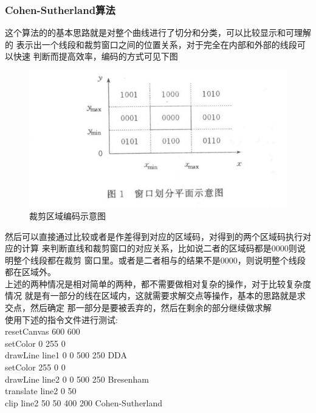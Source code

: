 \documentclass[a4paper,UTF8]{article}
\theoremstyle{definition}
\begin{document}
\subsubsection{Cohen-Sutherland算法}
这个算法的的基本思路就是对整个曲线进行了切分和分类，可以比较显示和可理解的
表示出一个线段和裁剪窗口之间的位置关系，对于完全在内部和外部的线段可以快速
判断而提高效率，编码的方式可见下图
\begin{figure}[h]
	\centering
	\includegraphics[scale=0.4]{figure/2.png}
	\caption{裁剪区域编码示意图}
	\label{fig:Rotate}
\end{figure}
然后可以直接通过比较或者是作差得到对应的区域码，对得到的两个区域码执行对应的计算
来判断直线和裁剪窗口的对应关系，比如说二者的区域码都是0000则说明整个线段都在裁剪
窗口里。或者是二者相与的结果不是0000，则说明整个线段都在区域外。\\
上述的两种情况是相对简单的两种，都不需要做相对复杂的操作，对于比较复杂度情况
就是有一部分的线在区域内，这就需要求解交点等操作，基本的思路就是求交点，然后确定
那一部分是要被丢弃的，然后在剩余的部分继续做求解\\
使用下述的指令文件进行测试:\\

resetCanvas 600 600\\

setColor 0 255 0\\

drawLine line1 0 0 500 250 DDA\\

setColor 255 0 0\\

drawLine line2 0 0 500 250 Bresenham\\

translate line2 0 50\\

clip line2 50 50 400 200 Cohen-Sutherland\\
\end{document}
